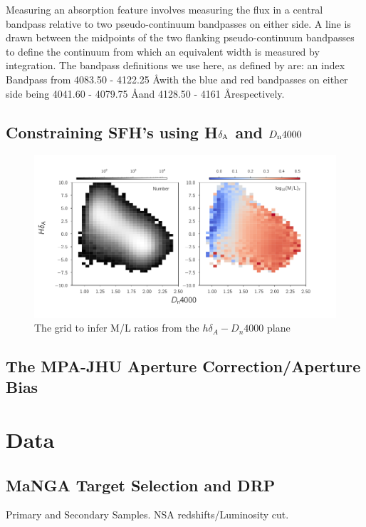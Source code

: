 Measuring an absorption feature involves measuring the flux in a central bandpass relative to two pseudo-continuum bandpasses on either side. A line is drawn between the midpoints of the two flanking pseudo-continuum bandpasses to define the continuum from which an equivalent width is measured by integration. The bandpass definitions we use here, as defined by \citet{worthey_comprehensive_1994} are: an index Bandpass from 4083.50 - 4122.25 \AA with the blue and red bandpasses on either side being 4041.60 - 4079.75 \AA and 4128.50 - 4161 \AA respectively.

\subsection{Constraining SFH's using H$\delta_{\rm A}$ and $D_{\rm n}4000$}
\label{kauffmann method}

\begin{figure}
\includegraphics[width=\textwidth]{figures/hd_d4000_mlratio_coarser_binning.pdf}
\caption[The \citet{kauffmann_stellar_2003} grid to infer M/L ratios from the $h\delta_{A}-D_{n}4000$ plane]
{The \citet{kauffmann_stellar_2003} grid to infer M/L ratios from the $h\delta_{A}-D_{n}4000$ plane
\label{fig:kauff_grid}}
\end{figure}


\subsection{The MPA-JHU Aperture Correction/Aperture Bias}
\label{apercorr}

\section{Data}

\subsection{MaNGA Target Selection and DRP}
\label{mangadrp}
Primary and Secondary Samples. NSA redshifts/Luminosity cut.

